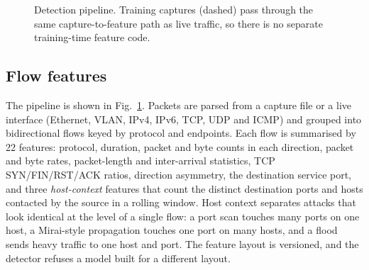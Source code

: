 \documentclass[conference]{IEEEtran}
\begin{document}
\begin{figure}[t]
\centering
{}
\caption{Detection pipeline. Training captures (dashed) pass through the
same capture-to-feature path as live traffic, so there is no separate
training-time feature code.}
\label{fig:arch}
\end{figure}

\subsection{Flow features}
The pipeline is shown in Fig.~\ref{fig:arch}. Packets are parsed from a
capture file or a live interface (Ethernet, VLAN, IPv4, IPv6, TCP, UDP and
ICMP) and grouped into bidirectional flows keyed by protocol and endpoints.
Each flow is summarised by 22 features: protocol, duration, packet and byte
counts in each direction, packet and byte rates, packet-length and
inter-arrival statistics, TCP SYN/FIN/RST/ACK ratios, direction asymmetry,
the destination service port, and three \emph{host-context} features that
count the distinct destination ports and hosts contacted by the source in
a rolling window. Host context separates attacks that look identical at
the level of a single flow: a port scan touches many ports on one host, a
Mirai-style propagation touches one port on many hosts, and a flood sends
heavy traffic to one host and port. The feature layout is versioned, and
the detector refuses a model built for a different layout.
\end{document}

